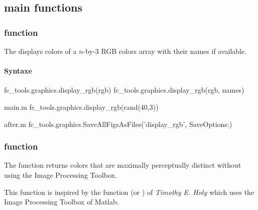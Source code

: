 
\subsection{main functions}

\subsubsection[fc\_tools.graphics.display\_rgb function]{ function}
The  displays colors of a $n$-by-$3$ RGB colors array with their names
if available.
\paragraph{Syntaxe}
\begin{syntaxe}
fc_tools.graphics.display_rgb(rgb)
fc_tools.graphics.display_rgb(rgb, names)
\end{syntaxe}

\begin{filecontents*}{main.m}
fc_tools.graphics.display_rgb(rand(40,3))
\end{filecontents*}
\begin{filecontents*}{after.m}
fc_tools.graphics.SaveAllFigsAsFiles('display_rgb', SaveOptions{:})
\end{filecontents*}

\begin{center}
\end{center}

\subsubsection[fc\_tools.graphics.selectColors function]{ function}
The  function returns colors that are maximally perceptually distinct
 without using the Image Processing Toolbox.
 
This function is inspired by the function  (or ) of
\textit{Timothy E. Holy} which uses the Image Processing Toolbox of Matlab.
